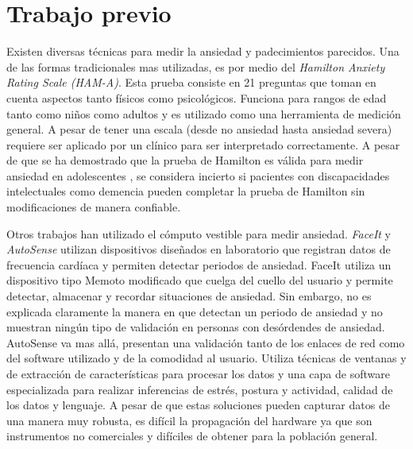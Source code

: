 \documentclass[letterpaper,12pt]{cicese}
\begin{document}
		\chapter{Trabajo previo}
				Existen diversas t\'ecnicas para medir la ansiedad y padecimientos parecidos. Una de las formas tradicionales mas utilizadas, es por medio del \emph{Hamilton Anxiety Rating Scale (HAM-A)}\citep{Hamilton1959}. Esta prueba consiste en 21 preguntas que toman en cuenta aspectos tanto f\'isicos como psicol\'ogicos. Funciona para rangos de edad tanto como ni\~nos como adultos y es utilizado como una herramienta de medici\'on general. A pesar de tener una escala (desde no ansiedad hasta ansiedad severa)  requiere ser aplicado por un cl\'inico para ser interpretado correctamente. A pesar de que se ha demostrado que la prueba de Hamilton es v\'alida para medir ansiedad en adolescentes \citep{CLARK1994354}, se considera incierto si pacientes con discapacidades intelectuales como demencia pueden completar la prueba de Hamilton sin modificaciones de manera confiable\citep{Bradford2013125}.

				Otros trabajos han utilizado el c\'omputo vestible para medir ansiedad. {\emph{FaceIt}\citep{Rennert2013}} y {\emph{AutoSense}\citep{Ertin2011}} utilizan dispositivos dise\~nados en laboratorio que registran datos de frecuencia card\'iaca y permiten detectar periodos de ansiedad. FaceIt utiliza un dispositivo tipo Memoto modificado que cuelga del cuello del usuario y permite detectar, almacenar y recordar situaciones de ansiedad. Sin embargo, no es explicada claramente la manera en que detectan un periodo de ansiedad y no muestran ning\'un tipo de validaci\'on en personas con des\'ordendes de ansiedad. AutoSense va mas all\'a, presentan una validaci\'on tanto de los enlaces de red como del software utilizado y de la comodidad al usuario. Utiliza t\'ecnicas de ventanas y de extracci\'on de caracter\'isticas para procesar los datos y una capa de software especializada para realizar inferencias de estr\'es, postura y actividad, calidad de los datos y lenguaje. A pesar de que estas soluciones pueden capturar datos de una manera muy robusta, es dif\'icil la propagaci\'on del hardware ya que son instrumentos no comerciales y dif\'iciles de obtener para la poblaci\'on general.
	
\end{document}
